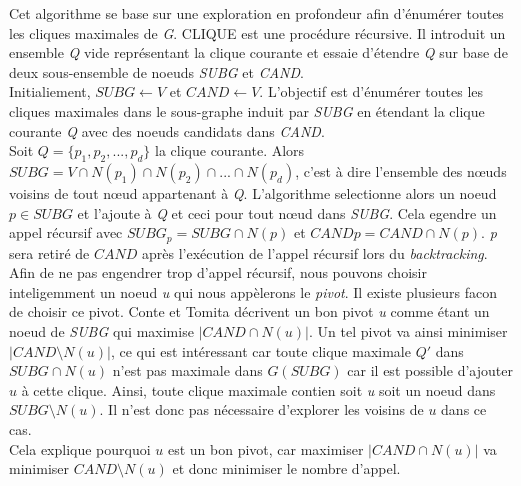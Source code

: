 \documentclass[a4paper, 12pt]{article}
\begin{document}
Cet algorithme se base sur une exploration en profondeur afin d'énumérer toutes les cliques maximales de \emph{G}.
CLIQUE est une procédure récursive. Il introduit un ensemble \emph{Q} vide représentant la clique courante et essaie d'étendre \emph{Q} sur base de deux sous-ensemble de noeuds \textit{SUBG} et \textit{CAND}.\\

Initialiement, $ SUBG \leftarrow V $ et $ CAND \leftarrow V $. L'objectif est d'énumérer toutes les cliques maximales dans le sous-graphe induit par \emph{SUBG} en étendant la clique courante \emph{Q} avec des noeuds candidats dans \emph{CAND}. \\

Soit $ Q = \{p_1, p_2, ..., p_d\} $ la clique courante.
Alors $ SUBG = V \cap N(p_1) \cap N(p_2) \cap ... \cap N(p_d)$, c'est à dire l'ensemble des nœuds voisins de tout
nœud appartenant à \emph{Q}. L'algorithme selectionne alors  un noeud $ p \in SUBG $ et l'ajoute à \emph{Q} et
ceci pour tout nœud dans \emph{SUBG}. Cela egendre un appel récursif avec $ SUBG_p = SUBG \cap N(p) $ et $ CANDp = CAND \cap N(p) $. \emph{p} sera retiré de $ CAND $ après l'exécution de l'appel récursif lors du \textit{backtracking}. \\


Afin de ne pas engendrer trop d'appel récursif, nous pouvons choisir
inteligemment un noeud \textit{u} qui nous appèlerons le \textit{pivot}. Il existe plusieurs facon de choisir
ce pivot. Conte et Tomita\cite{contetomita} décrivent un bon pivot \emph{u} comme étant un noeud de
\emph{SUBG} qui maximise $ | CAND \cap N(u) |$. Un tel pivot va ainsi minimiser $ |CAND \setminus N(u)| $, ce
qui est intéressant car toute clique maximale $ Q' $ dans $ SUBG \cap N(u) $ n'est pas maximale dans
$ G(SUBG) $ car il est possible d'ajouter $ u $ à cette clique. Ainsi, toute clique maximale contien soit
\textit{u} soit un noeud dans $ SUBG \setminus N(u)$. Il n'est donc pas nécessaire d'explorer les voisins de
$ u $ dans ce cas. \\
Cela explique pourquoi $ u $ est un bon pivot, car maximiser $ | CAND \cap N(u) | $ va minimiser
$ CAND \setminus N(u)$ et donc minimiser le nombre d'appel.
\end{document}
